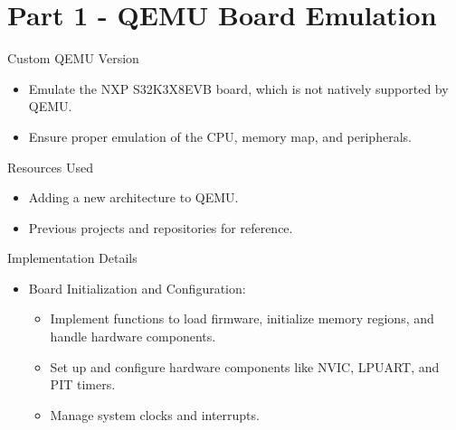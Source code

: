 \section{Part 1 - QEMU Board Emulation}

\begin{frame}{Custom QEMU Version}
    \begin{itemize}
        \item Emulate the NXP S32K3X8EVB board, which is not natively supported by QEMU.
        \item Ensure proper emulation of the CPU, memory map, and peripherals.
    \end{itemize}
\end{frame}

\begin{frame}{Resources Used}
    \begin{itemize}
        \item Adding a new architecture to QEMU.
        \item Previous projects and repositories for reference.
    \end{itemize}
\end{frame}

\begin{frame}{Implementation Details}
    \begin{itemize}
        \item Board Initialization and Configuration:
        \begin{itemize}
            \item Implement functions to load firmware, initialize memory regions, and handle hardware components.
            \item Set up and configure hardware components like NVIC, LPUART, and PIT timers.
            \item Manage system clocks and interrupts.
        \end{itemize}
    \end{itemize}
\end{frame}
